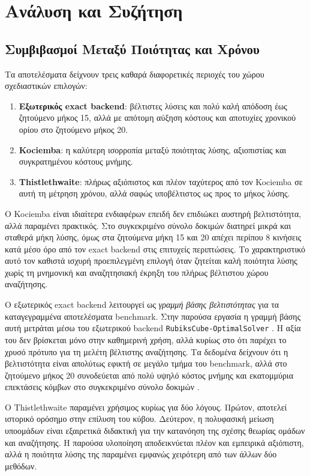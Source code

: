 \section{Ανάλυση και Συζήτηση}

\subsection{Συμβιβασμοί Μεταξύ Ποιότητας και Χρόνου}

Τα αποτελέσματα δείχνουν τρεις καθαρά διαφορετικές περιοχές του χώρου σχεδιαστικών επιλογών:
\begin{enumerate}
    \item \textbf{Εξωτερικός exact backend}: βέλτιστες λύσεις και πολύ καλή απόδοση έως ζητούμενο μήκος 15, αλλά με απότομη αύξηση κόστους και αποτυχίες χρονικού ορίου στο ζητούμενο μήκος 20.
    \item \textbf{Kociemba}: η καλύτερη ισορροπία μεταξύ ποιότητας λύσης, αξιοπιστίας και συγκρατημένου κόστους μνήμης.
    \item \textbf{Thistlethwaite}: πλήρως αξιόπιστος και πλέον ταχύτερος από τον Kociemba σε αυτή τη μέτρηση χρόνου, αλλά σαφώς υποβέλτιστος ως προς το μήκος λύσης.
\end{enumerate}

Ο Kociemba είναι ιδιαίτερα ενδιαφέρων επειδή δεν επιδιώκει αυστηρή
βελτιστότητα, αλλά παραμένει πρακτικός. Στο συγκεκριμένο σύνολο δοκιμών διατηρεί μικρά
και σταθερά μήκη λύσης, όμως στα ζητούμενα μήκη 15 και 20 απέχει περίπου 8
κινήσεις κατά μέσο όρο από τον exact backend στις επιτυχείς περιπτώσεις. Το
χαρακτηριστικό αυτό τον καθιστά ισχυρή προεπιλεγμένη επιλογή όταν ζητείται
καλή ποιότητα λύσης χωρίς τη μνημονική και αναζητησιακή έκρηξη του πλήρως
βέλτιστου χώρου αναζήτησης.

Ο εξωτερικός exact backend λειτουργεί ως \emph{γραμμή βάσης βελτιστότητας} για τα καταγεγραμμένα αποτελέσματα benchmark. Στην παρούσα εργασία η
γραμμή βάσης αυτή μετράται μέσω του εξωτερικού backend
\texttt{RubiksCube-OptimalSolver} \cite{kociemba_rubiks_optimal}. Η αξία του
δεν βρίσκεται μόνο στην καθημερινή χρήση, αλλά κυρίως στο ότι παρέχει το
χρυσό πρότυπο για τη μελέτη βέλτιστης αναζήτησης. Τα δεδομένα δείχνουν ότι η
βελτιστότητα είναι απολύτως εφικτή σε μεγάλο τμήμα του benchmark, αλλά στο
ζητούμενο μήκος 20 συνοδεύεται από πολύ υψηλό κόστος μνήμης και εκατομμύρια επεκτάσεις
κόμβων στο συγκεκριμένο σύνολο δοκιμών \cite{korf2001timecomplexity}.

Ο Thistlethwaite παραμένει χρήσιμος κυρίως για δύο λόγους. Πρώτον, αποτελεί
ιστορικό ορόσημο στην επίλυση του κύβου. Δεύτερον, η πολυφασική μείωση
υποομάδων είναι εξαιρετικά διδακτική για την κατανόηση της σχέσης θεωρίας
ομάδων και αναζήτησης. Η παρούσα υλοποίηση αποδεικνύεται πλέον και εμπειρικά
αξιόπιστη, αλλά η ποιότητα λύσης της παραμένει εμφανώς χειρότερη από των άλλων
δύο μεθόδων.

